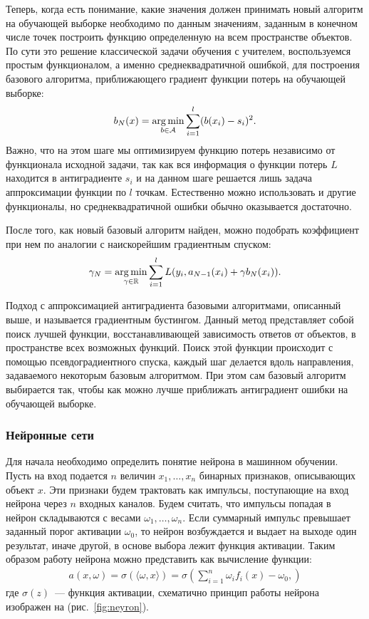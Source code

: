 \documentclass[12pt,a4paper]{article} %
\begin{document}
Теперь, когда есть понимание, какие значения должен принимать новый алгоритм на обучающей выборке необходимо по данным значениям, заданным в конечном числе точек построить функцию определенную на всем пространстве объектов. По сути это решение классической задачи обучения с учителем, воспользуемся простым функционалом, а именно среднеквадратичной ошибкой, для построения базового алгоритма, приближающего градиент функции потерь на обучающей выборке:
\begin{gather}\label{gradbust7}
	b_N(x) = \mathop{\rm arg\,min}\limits_{b\in\mathcal{A}} \sum\limits_{i=1}^{l}(b(x_i)-s_i)^2.
\end{gather}
Важно, что на этом шаге мы оптимизируем функцию потерь независимо от функционала исходной задачи, так как вся информация о функции потерь $L$ находится в антиградиенте 
$s_i$ и на данном шаге решается лишь задача аппроксимации функции по $l$ точкам. Естественно можно использовать и другие функционалы, но среднеквадратичной ошибки обычно оказывается достаточно. 

После того, как новый базовый алгоритм найден, можно подобрать коэффициент при нем по аналогии с наискорейшим градиентным спуском:
\begin{gather}\label{gradbust8}
\gamma_N = \mathop{\rm arg\,min}\limits_{\gamma\in\mathbb{R}}\sum\limits_{i=1}^{l}L(y_i, a_{N-1}(x_i) + \gamma b_N(x_i)).
\end{gather}

Подход с аппроксимацией антиградиента базовыми алгоритмами, описанный выше, и называется градиентным бустингом. Данный метод представляет собой поиск лучшей функции, восстанавливающей зависимость ответов от объектов, в пространстве всех возможных функций. Поиск этой функции происходит с помощью псевдоградиентного спуска, каждый шаг делается вдоль направления, задаваемого некоторым базовым алгоритмом. При этом сам базовый алгоритм выбирается так, чтобы как можно лучше приближать антиградиент ошибки на обучающей выборке.  

\subsubsection{Нейронные сети}
Для начала необходимо определить понятие нейрона в машинном обучении. Пусть на вход подается $n$ величин $x_1,\dots, x_n$ бинарных признаков, описывающих объект $x$. Эти признаки будем трактовать как импульсы, поступающие на вход нейрона через $n$ входных каналов. Будем считать, что импульсы попадая в нейрон складываются с весами $\omega_1,\dots,\omega_n$. Если суммарный импульс превышает заданный порог активации $\omega_0$, то нейрон возбуждается и выдает на выходе один результат, иначе другой, в основе выбора лежит функция активации. Таким образом работу нейрона можно представить как вычисление функции:
\begin{gather}\label{ney1}
	a(x,\omega) = \sigma(\langle \omega, x \rangle) = \sigma\left(\sum\limits_{i=1}^{n} \omega_if_i(x)-\omega_0, \right)
\end{gather}
где $\sigma(z)$~--- функция активации, схематично принцип работы нейрона изображен на (рис.~\ref{fig:neyron}).
\end{document}
